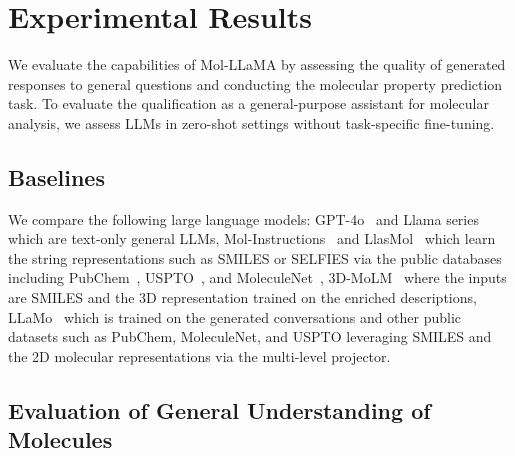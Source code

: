 
\vspace{-0.05in}
\section{Experimental Results}
\vspace{-0.05in}
We evaluate the capabilities of Mol-LLaMA by assessing the quality of generated responses to general questions and conducting the molecular property prediction task. To evaluate the qualification as a general-purpose assistant for molecular analysis, we assess LLMs in zero-shot settings without task-specific fine-tuning. 

\vspace{-0.05in}
\subsection{Baselines}
\vspace{-0.05in}
We compare the following large language models: GPT-4o~\cite{openai2024gpt4ocard} and Llama series~\cite{touvron2023llama2,grattafiori2024llama3} which are text-only general LLMs, Mol-Instructions~\cite{fang2023molinstruction} and LlasMol~\cite{yu2024llasmol} which learn the string representations such as SMILES or SELFIES via the public databases including PubChem~\cite{kim2021pubchem}, USPTO~\cite{wei2010uspto,lu2022uspto}, and MoleculeNet~\cite{wu2018moleculenet}, 3D-MoLM~\cite{li2024molm} where the inputs are SMILES and the 3D representation trained on the enriched descriptions, LLaMo~\cite{park2024llamo} which is trained on the generated conversations and other public datasets such as PubChem, MoleculeNet, and USPTO leveraging SMILES and the 2D molecular representations via the multi-level projector.

\vspace{-0.04in}
\subsection{Evaluation of General Understanding of Molecules}
\vspace{-0.04in}
